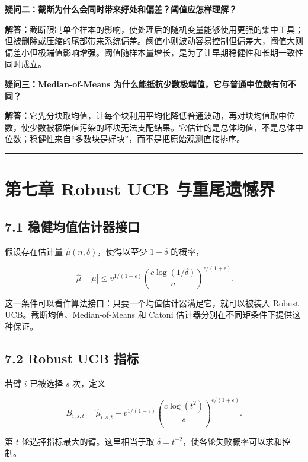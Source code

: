 \documentclass[
  11pt,
  a4paper,
]{ctexart}
\begin{document}
\textbf{疑问二：截断为什么会同时带来好处和偏差？阈值应怎样理解？}

\textbf{解答：}截断限制单个样本的影响，使处理后的随机变量能够使用更强的集中工具；但被删除或压缩的尾部带来系统偏差。阈值小则波动容易控制但偏差大，阈值大则偏差小但极端值影响增强。阈值随样本量增长，是为了让早期稳健性和长期一致性同时成立。

\textbf{疑问三：Median-of-Means 为什么能抵抗少数极端值，它与普通中位数有何不同？}

\textbf{解答：}它先分块取均值，让每个块利用平均化降低普通波动，再对块均值取中位数，使少数被极端值污染的坏块无法支配结果。它估计的是总体均值，不是总体中位数；稳健性来自“多数块是好块”，而不是把原始观测直接排序。

\begin{center}\rule{0.5\linewidth}{0.5pt}\end{center}

\section{第七章 Robust UCB
与重尾遗憾界}\label{ux7b2cux4e03ux7ae0-robust-ucb-ux4e0eux91cdux5c3eux9057ux61beux754c}

\subsection{7.1
稳健均值估计器接口}\label{ux7a33ux5065ux5747ux503cux4f30ux8ba1ux5668ux63a5ux53e3}

假设存在估计量 \(\widehat\mu(n,\delta)\)，使得以至少 \(1-\delta\)
的概率，

\[
|\widehat\mu-\mu|
\le
v^{1/(1+\epsilon)}
\left(\frac{c\log(1/\delta)}n\right)^{\epsilon/(1+\epsilon)}.
\]

这一条件可以看作算法接口：只要一个均值估计器满足它，就可以被装入 Robust
UCB。截断均值、Median-of-Means 和 Catoni
估计器分别在不同矩条件下提供这种保证。

\subsection{7.2 Robust UCB 指标}\label{robust-ucb-ux6307ux6807}

若臂 \(i\) 已被选择 \(s\) 次，定义

\[
B_{i,s,t}
=\widehat\mu_{i,s,t}
+v^{1/(1+\epsilon)}
\left(\frac{c\log(t^2)}s\right)^{\epsilon/(1+\epsilon)}.
\]

第 \(t\) 轮选择指标最大的臂。这里相当于取
\(\delta=t^{-2}\)，使各轮失败概率可以求和控制。
\end{document}
